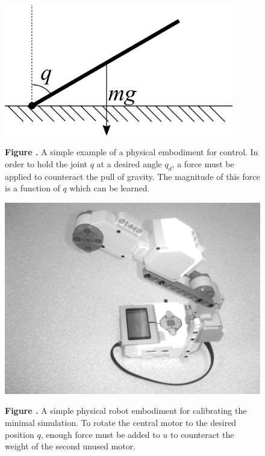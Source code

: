 \documentclass{frontiersSCNS} %
\begin{document}
\begin{figure}[h!]
\begin{center}
\includegraphics[width=10cm]{figures/SingleArmSystem}
\end{center}
 \textbf{\label{fig:system} Figure .}{ 
     A simple example of a physical embodiment for control.  In order to hold
     the joint $q$ at a desired angle $q_d$, a force must be applied to
     counteract the pull of gravity.  The magnitude of this force is a
 function of $q$ which can be learned.}
\end{figure}

\begin{figure}[h!]
\begin{center}
\includegraphics[width=18cm]{figures/lego}
\end{center}
 \textbf{\label{fig:lego} Figure .}{ A
     simple physical robot embodiment for calibrating the minimal simulation.
     To rotate the central motor to the desired position $q$, enough force
 must be added to $u$ to counteract the weight of the second unused motor.}
\end{figure}
\end{document}
